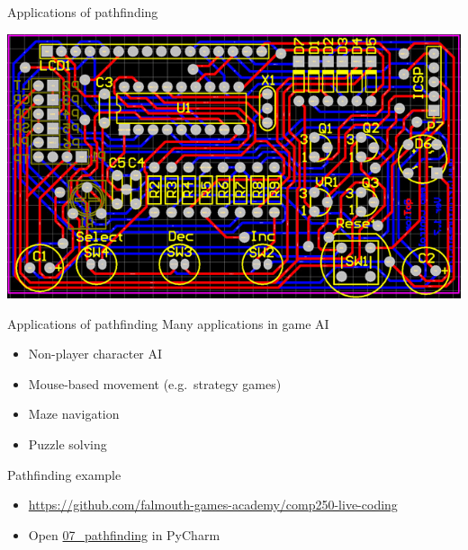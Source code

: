 \begin{frame}{Applications of pathfinding}
    \begin{center}
        \includegraphics[width=\textwidth]{pcb}
    \end{center}
\end{frame}

\begin{frame}{Applications of pathfinding}
    Many applications in game AI \pause
    \begin{itemize}
        \item Non-player character AI \pause
        \item Mouse-based movement (e.g.\ strategy games) \pause
        \item Maze navigation \pause
        \item Puzzle solving
    \end{itemize}
\end{frame}

\begin{frame}{Pathfinding example}
    \begin{itemize}
        \pause\item \url{https://github.com/falmouth-games-academy/comp250-live-coding}
        \pause\item Open \url{07_pathfinding} in PyCharm
    \end{itemize}
\end{frame}

